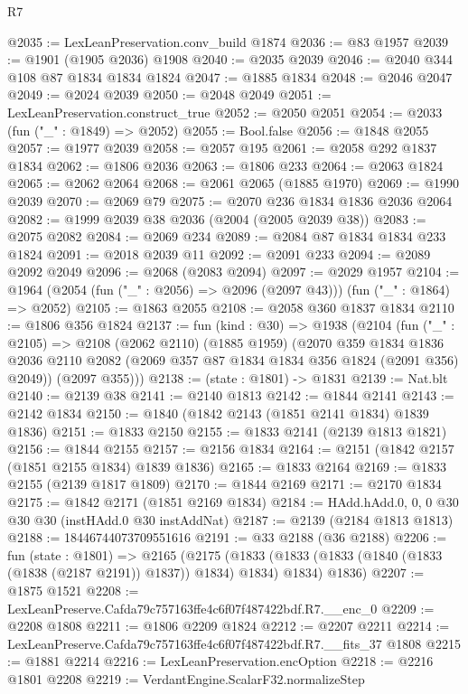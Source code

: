\begin{lexlean}{R7}
\begin{coremodule}
@2035 := LexLeanPreservation.conv_build @1874
@2036 := @83 @1957
@2039 := @1901 (@1905 @2036) @1908
@2040 := @2035 @2039
@2046 := @2040 @344 @108 @87 @1834 @1834 @1824
@2047 := @1885 @1834
@2048 := @2046 @2047
@2049 := @2024 @2039
@2050 := @2048 @2049
@2051 := LexLeanPreservation.construct_true
@2052 := @2050 @2051
@2054 := @2033 (fun ("_" : @1849) => @2052)
@2055 := Bool.false
@2056 := @1848 @2055
@2057 := @1977 @2039
@2058 := @2057 @195
@2061 := @2058 @292 @1837 @1834
@2062 := @1806 @2036
@2063 := @1806 @233
@2064 := @2063 @1824
@2065 := @2062 @2064
@2068 := @2061 @2065 (@1885 @1970)
@2069 := @1990 @2039
@2070 := @2069 @79
@2075 := @2070 @236 @1834 @1836 @2036 @2064
@2082 := @1999 @2039 @38 @2036 (@2004 (@2005 @2039 @38))
@2083 := @2075 @2082
@2084 := @2069 @234
@2089 := @2084 @87 @1834 @1834 @233 @1824
@2091 := @2018 @2039 @11
@2092 := @2091 @233
@2094 := @2089 @2092 @2049
@2096 := @2068 (@2083 @2094)
@2097 := @2029 @1957
@2104 := @1964 (@2054 (fun ("_" : @2056) => @2096 (@2097 @43))) (fun ("_" : @1864) => @2052)
@2105 := @1863 @2055
@2108 := @2058 @360 @1837 @1834
@2110 := @1806 @356 @1824
@2137 := fun (kind : @30) =>
  @1938
    (@2104
      (fun ("_" : @2105) =>
      @2108
        (@2062 @2110)
        (@1885 @1959)
        (@2070
          @359
          @1834
          @1836
          @2036
          @2110
          @2082
          (@2069 @357 @87 @1834 @1834 @356 @1824 (@2091 @356) @2049))
        (@2097 @355)))
@2138 := (state : @1801) -> @1831
@2139 := Nat.blt
@2140 := @2139 @38
@2141 := @2140 @1813
@2142 := @1844 @2141
@2143 := @2142 @1834
@2150 := @1840 (@1842 @2143 (@1851 @2141 @1834) @1839 @1836)
@2151 := @1833 @2150
@2155 := @1833 @2141 (@2139 @1813 @1821)
@2156 := @1844 @2155
@2157 := @2156 @1834
@2164 := @2151 (@1842 @2157 (@1851 @2155 @1834) @1839 @1836)
@2165 := @1833 @2164
@2169 := @1833 @2155 (@2139 @1817 @1809)
@2170 := @1844 @2169
@2171 := @2170 @1834
@2175 := @1842 @2171 (@1851 @2169 @1834)
@2184 := HAdd.hAdd.{0, 0, 0} @30 @30 @30 (instHAdd.{0} @30 instAddNat)
@2187 := @2139 (@2184 @1813 @1813)
@2188 := 18446744073709551616
@2191 := @33 @2188 (@36 @2188)
@2206 := fun (state : @1801) =>
  @2165
    (@2175
      (@1833 (@1833 (@1833 (@1840 (@1833 (@1838 (@2187 @2191)) @1837)) @1834) @1834) @1834)
      @1836)
@2207 := @1875 @1521
@2208 := LexLeanPreserve.Cafda79c757163ffe4c6f07f487422bdf.R7.__enc_0
@2209 := @2208 @1808
@2211 := @1806 @2209 @1824
@2212 := @2207 @2211
@2214 := LexLeanPreserve.Cafda79c757163ffe4c6f07f487422bdf.R7.__fits_37 @1808
@2215 := @1881 @2214
@2216 := LexLeanPreservation.encOption
@2218 := @2216 @1801 @2208
@2219 := VerdantEngine.ScalarF32.normalizeStep

\end{coremodule}
\end{lexlean}
